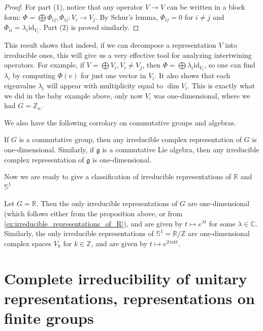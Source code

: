 \documentclass{report}
\begin{document}
\begin{proof}
For part (1), notice that any operator \( V \to V \) can be written in a block form: \( \Phi = \bigoplus \Phi_{ij}, \Phi_{ij} : V_i \to V_j \). By Schur's lemma, \( \Phi_{ij} = 0 \) for \( i \neq j \) and \( \Phi_{ii} = \lambda_i \mathrm{id}_{V_i} \). Part (2) is proved similarly.
\end{proof}

This result shows that indeed, if we can decompose a representation \( V \) into irreducible ones, this will give us a very effective tool for analyzing intertwining operators. For example, if \( V = \bigoplus V_i, V_i \neq V_j \), then \( \Phi = \bigoplus \lambda_i \mathrm{id}_{V_i} \), so one can find \( \lambda_i \) by computing \( \Phi(v) \) for just one vector in \( V_i \). It also shows that each eigenvalue \( \lambda_i \) will appear with multiplicity equal to \( \dim V_i \). This is exactly what we did in the baby example above, only now \( V_i \) was one-dimensional, where we had \( G = \mathbb{Z}_n \).

We also have the following corrolary on commutative groups and algebras.
\begin{proposition}
    If $G$ is a commutative group, then any irreducible complex
representation of $G$ is one-dimensional. Similarly, if $\mathfrak g$ is a commutative Lie algebra, then any irreducible complex representation of $\mathfrak g$ is one-dimensional.
\end{proposition}
Now we are ready to give a classification of irreducible representations of $\mathbb R$ and $\mathbb S^1$
\begin{example}\label{ex:irreducible_representations_of_R}
    Let $G = \mathbb R$.
    Then the only irreducible representations of $G$ are one-dimensional (which follows either from the proposition above, or from \cref{ex:irreducible_representations_of_R}), and are given by $t \mapsto e^{\lambda t} $ for some $\lambda \in \mathbb C$.
    Similarly, the only irreducible representations of $\mathbb S^1 = \mathbb R/ \mathbb Z$ are one-dimensional complex spaces $V_k$ for $k \in \mathbb Z$, and are given by $t \mapsto e^{2\pi i k t}$.
\end{example}

\section{Complete irreducibility of unitary representations, representations on finite groups}
\end{document}
